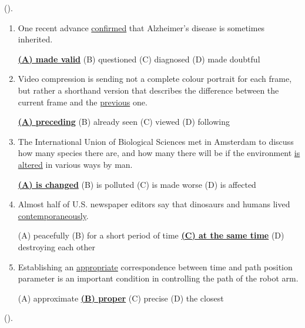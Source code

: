 \documentclass[main.tex]{subfiles}
\begin{document}
\setcounter{section}{100}

\linksectionold{\color{mygray}{Февральский зачёт 14.02.2024 (Смольская Н.Б.)}}

\sublinksectionold{\color{mygray}{Выполненное первое задание}}

\hypertarget{ltask:2024-02-14}{} (\hyperref[task:2024-02-14]{\color{blue}{перейти к тексту задания без выбранного варианта ответа}}).
\vspace{3mm}

\begin{enumerate}[nosep,leftmargin=*]
	\itemsep10pt
	\item One recent advance \uline{confirmed} that Alzheimer's disease is sometimes inherited.
	
	\uline{\textbf{(A) made valid}} \quad (B) questioned \quad (C) diagnosed \quad (D) made doubtful
	\item Video compression is sending not a complete colour portrait for each frame, but rather a shorthand version that describes the difference between the current frame and the \uline{previous} one.
	
	\uline{\textbf{(A) preceding}} \quad (B) already seen \quad (C) viewed \quad (D) following
	\item The International Union of Biological Sciences met in Amsterdam to discuss how many species there are, and how many there will be if the environment \uline{is altered} in various ways by man.
	
	\uline{\textbf{(A) is changed}} \quad (B) is polluted \quad (C) is made worse \quad (D) is affected
	\item Almost half of U.S. newspaper editors say that dinosaurs and humans lived \uline{contemporaneously}.
	
	(A) peacefully \quad (B) for a short period of time \quad \uline{\textbf{(C) at the same time}} \quad (D) destroying each other
	\item Establishing an \uline{appropriate} correspondence between time and path position parameter is an important condition in controlling the path of the robot arm.
	
	(A) approximate \quad \uline{\textbf{(B) proper}} \quad (C) precise \quad (D) the closest
\end{enumerate}

\sublinksectionold{\color{mygray}{Выполненное второе задание}}

 (\hyperref[task:2024-02-14]{\color{blue}{перейти к тексту задания без выбранного варианта ответа}}).
\vspace{3mm}
\end{document}
